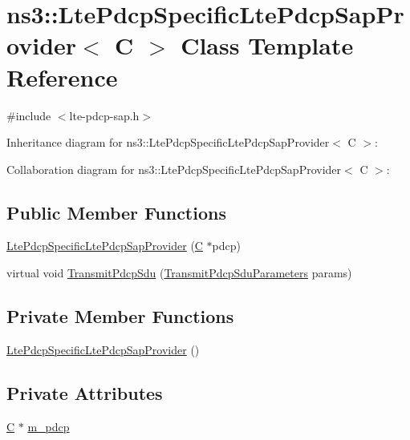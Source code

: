\hypertarget{classns3_1_1LtePdcpSpecificLtePdcpSapProvider}{}\section{ns3\+:\+:Lte\+Pdcp\+Specific\+Lte\+Pdcp\+Sap\+Provider$<$ C $>$ Class Template Reference}
\label{classns3_1_1LtePdcpSpecificLtePdcpSapProvider}


{\ttfamily \#include $<$lte-\/pdcp-\/sap.\+h$>$}



Inheritance diagram for ns3\+:\+:Lte\+Pdcp\+Specific\+Lte\+Pdcp\+Sap\+Provider$<$ C $>$\+:


Collaboration diagram for ns3\+:\+:Lte\+Pdcp\+Specific\+Lte\+Pdcp\+Sap\+Provider$<$ C $>$\+:
\subsection*{Public Member Functions}
\begin{DoxyCompactItemize}
\item 
\hyperlink{classns3_1_1LtePdcpSpecificLtePdcpSapProvider_aa4093693143c9b38eaad59083914ed1d}{Lte\+Pdcp\+Specific\+Lte\+Pdcp\+Sap\+Provider} (\hyperlink{loss__COST231__small__cities__urban_8m_aaa53ca0b650dfd85c4f59fa156f7a2cc}{C} $\ast$pdcp)
\item 
virtual void \hyperlink{classns3_1_1LtePdcpSpecificLtePdcpSapProvider_a3f5cc89e7e16df8bc1b08e6337625fe4}{Transmit\+Pdcp\+Sdu} (\hyperlink{structns3_1_1LtePdcpSapProvider_1_1TransmitPdcpSduParameters}{Transmit\+Pdcp\+Sdu\+Parameters} params)
\end{DoxyCompactItemize}
\subsection*{Private Member Functions}
\begin{DoxyCompactItemize}
\item 
\hyperlink{classns3_1_1LtePdcpSpecificLtePdcpSapProvider_ab2a2082ba423ae662a93f16014750cc1}{Lte\+Pdcp\+Specific\+Lte\+Pdcp\+Sap\+Provider} ()
\end{DoxyCompactItemize}
\subsection*{Private Attributes}
\begin{DoxyCompactItemize}
\item 
\hyperlink{loss__COST231__small__cities__urban_8m_aaa53ca0b650dfd85c4f59fa156f7a2cc}{C} $\ast$ \hyperlink{classns3_1_1LtePdcpSpecificLtePdcpSapProvider_ad8a2b0f987b6fe7003ee2061f18ba5d9}{m\+\_\+pdcp}
\end{DoxyCompactItemize}


